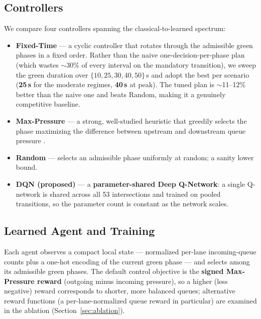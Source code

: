 \subsection{Controllers}

We compare four controllers spanning the classical-to-learned spectrum:

\begin{itemize}
  \item \textbf{Fixed-Time} --- a cyclic controller that rotates through the admissible
        green phases in a fixed order. Rather than the naive one-decision-per-phase plan
        (which wastes $\sim$30\% of every interval on the mandatory transition), we sweep
        the green duration over $\{10,25,30,40,50\}$\,s and adopt the best per scenario
        (\textbf{25\,s} for the moderate regimes, \textbf{40\,s} at peak). The tuned
        plan is $\sim$11--12\% better than the naive one and beats Random, making it a
        genuinely competitive baseline.
  \item \textbf{Max-Pressure} --- a strong, well-studied heuristic that greedily selects
        the phase maximizing the difference between upstream and downstream queue pressure
        \cite{MaxPressure_2013,PressLight_2019}.
  \item \textbf{Random} --- selects an admissible phase uniformly at random; a sanity
        lower bound.
  \item \textbf{DQN (proposed)} --- a \textbf{parameter-shared Deep Q-Network}: a single
        Q-network is shared across all 53 intersections and trained on pooled transitions,
        so the parameter count is constant as the network scales.
\end{itemize}

\subsection{Learned Agent and Training}

Each agent observes a compact local state --- normalized per-lane incoming-queue counts
plus a one-hot encoding of the current green phase --- and selects among its admissible
green phases. The default control objective is the \textbf{signed Max-Pressure reward}
(outgoing minus incoming pressure), so a higher (less negative) reward corresponds to
shorter, more balanced queues; alternative reward functions (a per-lane-normalized queue
reward in particular) are examined in the ablation (Section~\ref{sec:ablation}).

